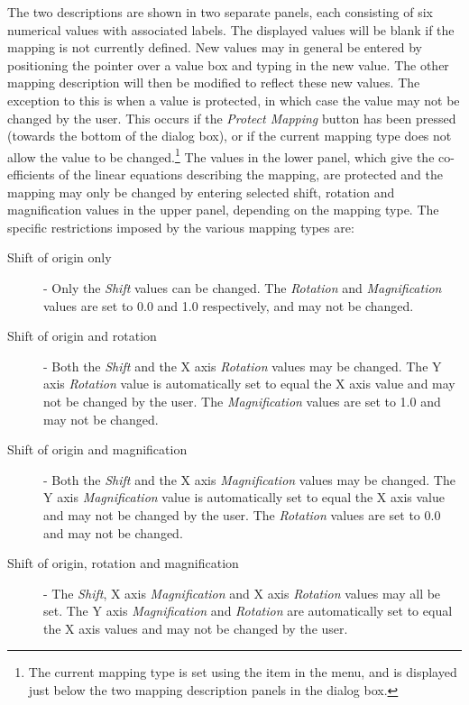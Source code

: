 \documentclass[11pt,nolof]{starlink}
\begin{document}
The two descriptions are shown in two separate panels, each consisting of
six numerical values with associated labels. The displayed values will be
blank if the mapping is not currently defined. New values may in general
be entered by positioning the pointer over a value box and typing in the
new value. The other mapping description will then be modified to reflect
these new values. The exception to this is when a value is protected, in
which case the value may not be changed by the user. This occurs if the
\emph{Protect Mapping} button has been pressed (towards the bottom of the
dialog box), or if the current mapping type does not allow the value to
be changed.\footnote{The current mapping type is set using the  item in the
 menu, and is displayed just
below the two mapping description panels in the dialog box.} The values
in the lower panel, which give the co-efficients of the linear equations
describing the mapping, are protected and the mapping may only be changed
by entering selected shift, rotation and magnification values in the upper
panel, depending on the mapping type. The specific restrictions imposed by
the various mapping types are:


\begin{description}

\item[Shift of origin only] - Only the \emph{Shift} values can be changed.
The \emph{Rotation} and \emph{Magnification} values are set to 0.0 and 1.0
respectively, and may not be changed.

\item[Shift of origin and rotation] - Both the \emph{Shift} and the X axis \emph{Rotation} values may be changed. The Y axis \emph{Rotation} value is
automatically set to equal the X axis value and may not be changed by the
user. The \emph{Magnification} values are set to 1.0 and may not be changed.

\item[Shift of origin and magnification] - Both the \emph{Shift} and the X
axis \emph{Magnification} values may be changed. The Y axis \emph{Magnification} value is automatically set to equal the X axis value and
may not be changed by the user. The \emph{Rotation} values are set to 0.0 and
may not be changed.

\item[Shift of origin, rotation and magnification] - The  \emph{Shift},
X axis \emph{Magnification} and X axis \emph{Rotation} values may all be set.
The Y axis \emph{Magnification} and \emph{Rotation} are automatically set
to equal the X axis values and may not be changed by the user.

\end{description}
\end{document}
